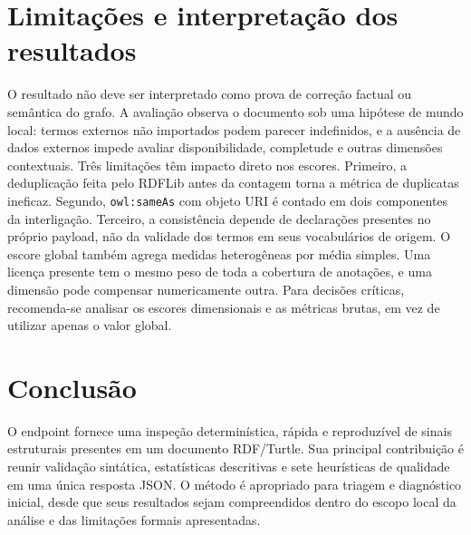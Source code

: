 \documentclass[12pt,a4paper]{article}
\begin{document}
\section{Limitações e interpretação dos resultados}
O resultado não deve ser interpretado como prova de correção factual ou semântica do grafo. A avaliação observa o documento sob uma hipótese de mundo local: termos externos não importados podem parecer indefinidos, e a ausência de dados externos impede avaliar disponibilidade, completude e outras dimensões contextuais. Três limitações têm impacto direto nos escores. Primeiro, a deduplicação feita pelo RDFLib antes da contagem torna a métrica de duplicatas ineficaz. Segundo, \texttt{owl:sameAs} com objeto URI é contado em dois componentes da interligação. Terceiro, a consistência depende de declarações presentes no próprio payload, não da validade dos termos em seus vocabulários de origem. O escore global também agrega medidas heterogêneas por média simples. Uma licença presente tem o mesmo peso de toda a cobertura de anotações, e uma dimensão pode compensar numericamente outra. Para decisões críticas, recomenda-se analisar os escores dimensionais e as métricas brutas, em vez de utilizar apenas o valor global.
\section{Conclusão}
O endpoint fornece uma inspeção determinística, rápida e reproduzível de sinais estruturais presentes em um documento RDF/Turtle. Sua principal contribuição é reunir validação sintática, estatísticas descritivas e sete heurísticas de qualidade em uma única resposta JSON. O método é apropriado para triagem e diagnóstico inicial, desde que seus resultados sejam compreendidos dentro do escopo local da análise e das limitações formais apresentadas.
\end{document}
